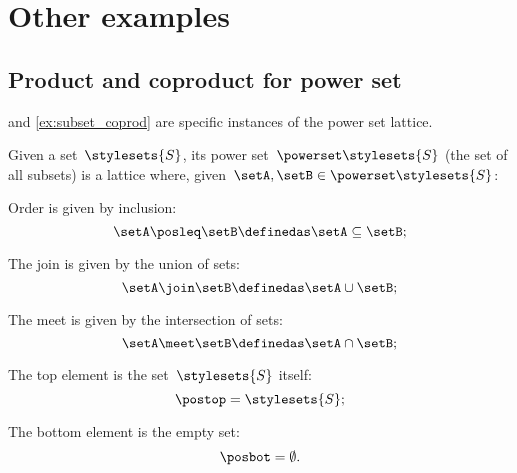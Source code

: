 
\section{Other examples}

\subsection{Product and coproduct for power set}
 and \cref{ex:subset_coprod} are specific instances of the power set lattice.

\begin{definition}
    \label{def:power-set-as-lattice}
    Given a set~$\stylesets{S}$, its power set~$\powerset \stylesets{S}$ (the set of all subsets) is a lattice where, given~$\setA,\setB\in \powerset \stylesets{S}$:
    \begin{compactitem}
        \item Order is given by inclusion:
        \begin{equation*}
            \setA\posleq \setB \definedas \setA\subseteq \setB;
        \end{equation*}
        \item The join is given by the union of sets:
        \begin{equation*}
            \setA\join \setB \definedas \setA\cup \setB;
        \end{equation*}
        \item The meet is given by the intersection of sets:
        \begin{equation*}
            \setA\meet \setB \definedas \setA\cap \setB;
        \end{equation*}
        \item The top element is the set~$\stylesets{S}$ itself:
        \begin{equation*}
            \postop = \stylesets{S};
        \end{equation*}
        \item The bottom element is the empty set:
        \begin{equation*}
            \posbot = \emptyset.
        \end{equation*}
    \end{compactitem}
\end{definition}

\begin{marginfigure}
    \centering
    \caption{}
    \label{fig:prod_coprod_power}
\end{marginfigure}


